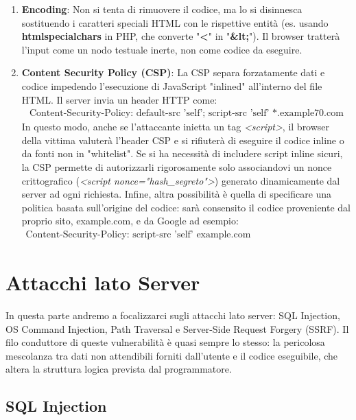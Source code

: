 \begin{enumerate}
    \item \textbf{Encoding}: Non si tenta di rimuovere il codice, ma lo si
    disinnesca sostituendo i caratteri speciali HTML con le rispettive 
    entità (es. usando \textbf{htmlspecialchars} in PHP, che converte "\textbf{<}" in "\textbf{\&lt;}"). 
    Il browser tratterà l'input come un nodo testuale inerte, non come 
    codice da eseguire.
    \item \textbf{Content Security Policy (CSP)}: La CSP separa forzatamente 
    dati e codice impedendo l'esecuzione di JavaScript "inlined" all'interno 
    del file HTML. Il server invia un header HTTP come:
    \begin{gather*}
        \text{Content-Security-Policy: default-src 'self'; script-src 'self' *.example70.com}
    \end{gather*}
    In questo modo, anche se l'attaccante inietta un tag \textit{<script>}, 
    il browser della vittima valuterà l'header CSP e si rifiuterà di 
    eseguire il codice inline o da fonti non in "whitelist". Se si ha 
    necessità di includere script inline sicuri, la CSP permette di 
    autorizzarli rigorosamente solo associandovi un nonce crittografico 
    (\textit{<script nonce="hash\_segreto">}) generato dinamicamente dal 
    server ad ogni richiesta. Infine, altra possibilità è quella di specificare
    una politica basata sull'origine del codice: sarà consensito il codice
    proveniente dal proprio sito, example.com, e da Google ad esempio:
    \begin{gather*}
        \text{Content-Security-Policy: script-src 'self' example.com https://apis.google.com}
    \end{gather*}
\end{enumerate}

\section{Attacchi lato Server}

In questa parte andremo a focalizzarci sugli attacchi lato server: SQL 
Injection, OS Command Injection, Path Traversal e Server-Side Request 
Forgery (SSRF). Il filo conduttore di queste vulnerabilità è quasi sempre 
lo stesso: la pericolosa mescolanza tra dati non attendibili forniti 
dall'utente e il codice eseguibile, che altera la struttura logica prevista 
dal programmatore.

\subsection{SQL Injection}


